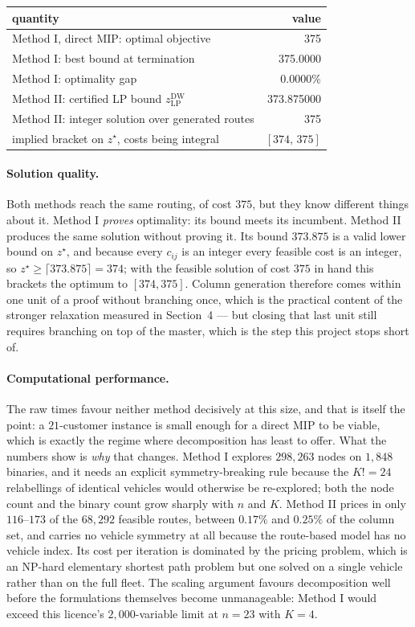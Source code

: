 \documentclass[11pt]{article}
\begin{document}
\begin{center}
\begin{tabular}{@{}lr@{}}
\toprule
quantity & value\\
\midrule
Method I, direct MIP: optimal objective & 375\\
Method I: best bound at termination & 375.0000\\
Method I: optimality gap & $0.0000\%$\\
Method II: certified LP bound
  $z^{\mathrm{DW}}_{\mathrm{LP}}$ & 373.875000\\
Method II: integer solution over generated routes & 375\\
implied bracket on $z^\star$, costs being integral
  & $[374,\,375]$\\
\bottomrule
\end{tabular}
\end{center}

\paragraph{Solution quality.} Both methods reach the same routing, of
cost $375$, but they know different things about it. Method I
\emph{proves} optimality: its bound meets its incumbent. Method II
produces the same solution without proving it. Its bound
$373.875$ is a valid lower bound on $z^\star$, and because every
$c_{ij}$ is an integer every feasible cost is an integer, so
$z^\star \ge \lceil 373.875 \rceil = 374$; with the feasible solution
of cost $375$ in hand this brackets the optimum to $[374,375]$. Column
generation therefore comes within one unit of a proof without
branching once, which is the practical content of the stronger
relaxation measured in Section~4 --- but closing that last unit still
requires branching on top of the master, which is the step this
project stops short of.

\paragraph{Computational performance.} The raw times favour neither
method decisively at this size, and that is itself the point: a
$21$-customer instance is small enough for a direct MIP to be viable,
which is exactly the regime where decomposition has least to offer.
What the numbers show is \emph{why} that changes. Method I explores
$298{,}263$ nodes on $1{,}848$ binaries, and it needs an explicit
symmetry-breaking rule because the $K! = 24$ relabellings of identical
vehicles would otherwise be re-explored; both the node count and the
binary count grow sharply with $n$ and $K$. Method II prices in only
$116$--$173$ of the $68{,}292$ feasible routes, between $0.17\%$ and
$0.25\%$ of the column set, and carries no vehicle symmetry at all
because the route-based model has no vehicle index. Its cost per
iteration is dominated by the pricing problem, which is an
NP-hard elementary shortest path problem but one solved on a single
vehicle rather than on the full fleet. The scaling argument favours
decomposition well before the formulations themselves become
unmanageable: Method I would exceed this licence's $2{,}000$-variable
limit at $n = 23$ with $K = 4$.
\end{document}
